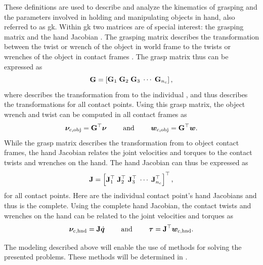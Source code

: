 These definitions are used to describe and analyze the kinematics of grasping and the parameters involved in holding and manipulating objects in hand, also referred to as \gls{gk}. Within \gls{gk} two matrices are of special interest: the grasping matrix  and the hand Jacobian . The grasping matrix describes the transformation between the twist or wrench of the object in world frame  to the twists or wrenches of the object in contact frames . The grasp matrix thus can be expressed as
%
\begin{equation}
	\mat{G} = \rvec{ \mat{G}_1 \vsep \mat{G}_2 \vsep \mat{G}_3 \vsep \cdots \vsep \mat{G}_{n_c}},
	\label{eq:grasp-matrix-def}
\end{equation}
%
where  describes the transformation from  to the individual , and thus  describes the transformations for all contact points. Using this grasp matrix, the object wrench and twist can be computed in all contact frames as
%
\begin{equation}
	\bm{\nu}_{c,\text{obj}} =  \bm{\mathrm{G}}^\top \bm{\nu} \qquad \text{ and } \qquad \bm{w}_{c,\text{obj}} =  \bm{\mathrm{G}}^\top \bm{w}.
	\label{eq:grasp-matrix-twist}
\end{equation}
%
While the grasp matrix describes the transformation from  to object contact frames, the hand Jacobian relates the joint velocities and torques to the contact twists and wrenches on the hand. The hand Jacobian can thus be expressed as 
%
\begin{equation}
	\mat{J} = \rvec{ \mat{J}_1^\T \vsep \mat{J}_2^\T \vsep \mat{J}_3^\T \vsep \cdots \vsep \mat{J}_{n_c}^\T}^\T,
	\label{eq:hand-jacobian-matrix}
\end{equation}
%
for all contact points. Here  are the individual contact point's hand Jacobians and thus  is the complete. Using the complete hand Jacobian, the contact twists and wrenches on the hand can be related to the joint velocities and torques as
% 
\begin{equation}
	\bm{\nu}_{c,\text{hnd}} = \bm{\mathrm{J}} \dot{\bm{q}} \qquad \text{ and } \qquad \bm{\tau} = \bm{\mathrm{J}}^\top \bm{w}_{c,\text{hnd}}.
	\label{eq:hand-jacobian-velocity}
\end{equation}

The modeling described above will enable the use of methods for solving the presented problems. These methods will be determined in .
